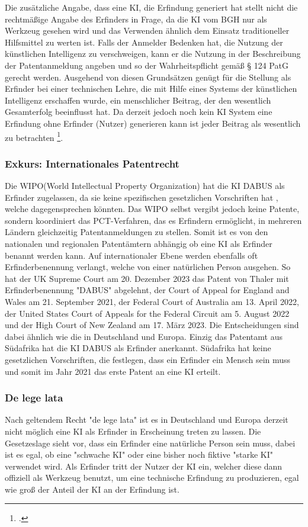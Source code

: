 Die zusätzliche Angabe, dass eine KI, die Erfindung
generiert hat stellt nicht die rechtmäßige
Angabe des Erfinders in Frage, da die KI vom BGH nur als 
Werkzeug gesehen wird und das Verwenden ähnlich dem 
Einsatz traditioneller Hilfsmittel zu werten ist.
Falls der Anmelder Bedenken hat, 
die Nutzung der künstlichen Intelligenz zu verschweigen, 
kann er die Nutzung in der Beschreibung der Patentanmeldung angeben 
und so der Wahrheitspflicht gemäß § 124 PatG gerecht werden.
Ausgehend von diesen Grundsätzen genügt 
für die Stellung als Erfinder bei einer technischen Lehre, 
die mit Hilfe eines Systems der künstlichen
Intelligenz erschaffen wurde, 
ein menschlicher Beitrag, 
der den wesentlich Gesamterfolg beeinflusst hat. 
Da derzeit jedoch noch kein KI System eine Erfindung ohne
Erfinder (Nutzer) generieren kann ist jeder Beitrag als
wesentlich zu betrachten \footcite{zivilsenatZB222024}.
\\

\subsubsection{Exkurs: Internationales Patentrecht\label{sec:intp}}
Die WIPO(World Intellectual Property Organization) 
hat die KI DABUS als Erfinder zugelassen,
da sie keine spezifischen gesetzlichen Vorschriften hat
, welche dagegensprechen könnten. 
Das WIPO
selbst vergibt jedoch keine Patente, 
sondern koordiniert das PCT-Verfahren, 
das es Erfindern ermöglicht, 
in mehreren Ländern gleichzeitig 
Patentanmeldungen zu stellen. 
Somit ist es
von den nationalen und regionalen Patentämtern abhängig
ob eine KI als Erfinder benannt werden kann.
Auf internationaler Ebene werden ebenfalls oft Erfinderbenennung verlangt,
welche von einer natürlichen Person ausgehen. So hat 
der UK Supreme Court am 20. Dezember 2023 das Patent von Thaler mit 
Erfinderbenennung "DABUS" abgelehnt, der Court of Appeal for England
and Wales am 21. September 2021,
der Federal Court of Australia am 13. April 2022,
der United States Court of Appeals for the
Federal Circuit am 5. August 2022 
und  der High Court of New
Zealand am 17. März 2023.
Die Entscheidungen sind dabei ähnlich wie die 
in Deutschland und Europa.
Einzig das Patentamt aus 
Südafrika hat die KI DABUS als Erfinder anerkannt.
Südafrika hat keine gesetzlichen Vorschriften, 
die festlegen, 
dass ein Erfinder ein Mensch sein muss und somit im Jahr 2021 das
erste Patent an eine KI erteilt.


\subsubsection{De lege lata}
Nach geltendem Recht "de lege lata" ist es in Deutschland und Europa
derzeit nicht möglich eine KI 
als Erfinder in Erscheinung treten zu lassen.
Die Gesetzeslage sieht vor, 
dass ein Erfinder eine natürliche Person sein muss,
dabei ist es egal, ob eine "schwache KI" oder eine 
bisher noch fiktive "starke KI" verwendet wird.
Als Erfinder tritt der Nutzer der KI ein, 
welcher diese dann offiziell
als Werkzeug benutzt,
um eine technische Erfindung zu produzieren, egal
wie groß der Anteil der KI an der Erfindung ist.


